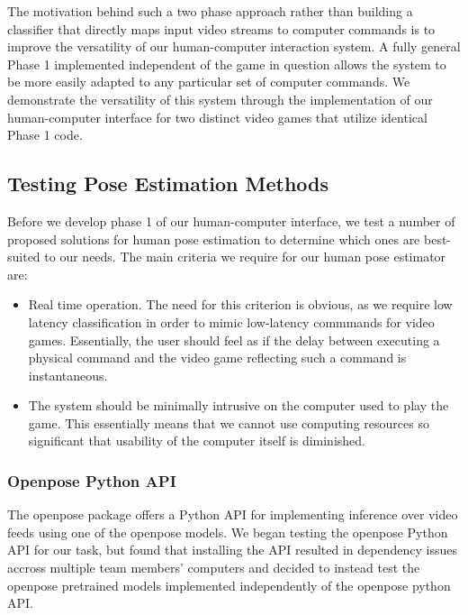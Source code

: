 \documentclass[10pt,twocolumn,letterpaper]{article}
\begin{document}
The motivation behind such a two phase approach rather than building a classifier that directly 
maps input video streams to computer commands is to improve the versatility of our human-computer 
interaction system. A fully general Phase 1 implemented independent of the game in question allows 
the system to be more easily adapted to any particular set of computer commands. We demonstrate the 
versatility of this system through the implementation of our human-computer interface for two 
distinct video games that utilize identical Phase 1 code.

\subsection{Testing Pose Estimation Methods}
Before we develop phase 1 of our human-computer interface, we test a number of proposed solutions 
for human pose estimation to determine which ones are best-suited to our needs. The main criteria 
we require for our human pose estimator are:

\begin{itemize}
    \item Real time operation. The need for this criterion is obvious, as we require low latency 
        classification in order to mimic low-latency commmands for video games. Essentially, the user 
        should feel as if the delay between executing a physical command and the video game reflecting 
        such a command is instantaneous.
    \item The system should be minimally intrusive on the computer used to play the game. This 
        essentially means that we cannot use computing resources so significant that usability of 
        the computer itself is diminished. 
\end{itemize}

\subsubsection{Openpose Python API}
The openpose package offers a Python API for implementing inference over video feeds using one 
of the openpose models. We began testing the openpose Python API for our task, but found that 
installing the API resulted in dependency issues accross multiple team members' computers and 
decided to instead test the openpose pretrained models implemented independently of the openpose 
python API.

\end{document}
